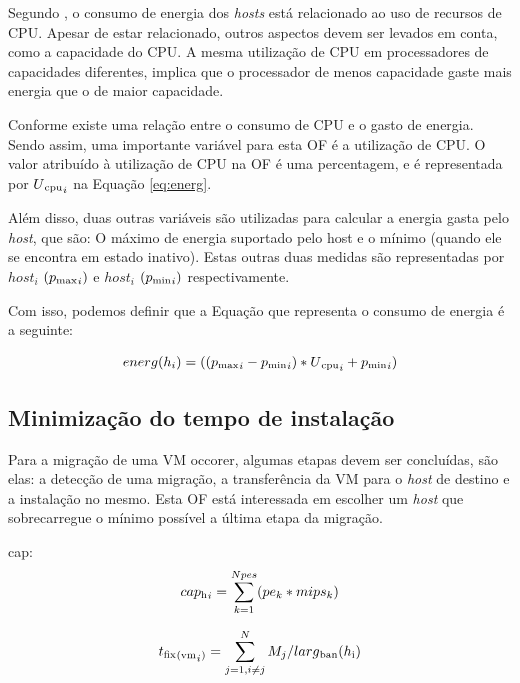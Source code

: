 Segundo \cite{beloglazov}, o consumo de energia dos \textit{hosts} está relacionado
ao uso de recursos de CPU. Apesar de estar relacionado, outros aspectos devem ser levados
em conta, como a capacidade do CPU. A mesma utilização de CPU em processadores de capacidades
diferentes, implica que o processador de menos capacidade gaste mais energia que o de maior capacidade.

Conforme \cite{beloglazov} existe uma relação entre o consumo de CPU e o gasto de energia. Sendo assim,
uma importante variável para esta OF é a utilização de CPU. O valor atribuído à utilização de CPU na OF é uma 
percentagem, e é representada por $ U\textsubscript{cpu}_i $ na Equação \ref{eq:energ}. 

Além disso, duas outras variáveis são utilizadas para calcular a energia gasta pelo \textit{host}, que são:
O máximo de energia suportado pelo host e o mínimo (quando ele se encontra em estado inativo). Estas outras duas
medidas são representadas por $ host_i $ $ (p\textsubscript{max}_i) $ e $ host_i $ $ (p\textsubscript{min}_i) $
respectivamente.

Com isso, podemos definir que a Equação que representa o consumo de energia é a seguinte:

\begin{equation}
energ(h_i ) =  ((p\textsubscript{max}_i - p\textsubscript{min}_i) * U\textsubscript{cpu}_i + p\textsubscript{min}_i) 
\label{eq:energ}
\end{equation}

\subsection{Minimização do tempo de instalação}

Para a migração de uma VM occorer, algumas etapas devem ser concluídas, são elas: 
a detecção de uma migração, a transferência da VM para o \textit{host} de destino 
e a instalação no mesmo. Esta OF está interessada em escolher um \textit{host} que 
sobrecarregue o mínimo possível a última etapa da migração. 

cap:
\begin{equation}
\begin{split}
cap\textsubscript{h}_i = \sum_{k=1}^{Npes}(pe_k * mips_k)
\end{split}
\end{equation}


\begin{equation}
t\textsubscript{fix}\textsubscript{(vm}_i\textsubscript{)} = \sum_{j=1,i \neq j}^{N} M_j/larg\textsubscript{ban}({h}\textsubscript{i})
\label{eq:tfix} 
\end{equation}

